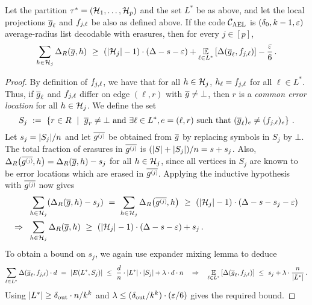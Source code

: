 \begin{lemma}\label{lemma:inductive}
Let the partition $\tau^* = ({\mathcal H}_1, \ldots, {\mathcal H}_p)$ and the set $L^*$ be as above, and let the local projections $\overline{g}_{\ell}$ and $f_{j,\ell}$ be also as defined above. If the code ${ {\mathcal C}_{\mathrm{AEL}} }$ is $(\delta_0,k-1,\varepsilon)$ average-radius list decodable with erasures, then for every $j\in [p]$,
\[			
\sum_{h\in \calH_j} \Delta_R(\erase{g},h) ~\geq~  (|\calH_j|-1) \cdot \inparen{\Delta - s - \eps} + \Ex{\ell \in L^*}{\Delta(\gl, \fjl)} - \frac{\eps}{6} \mper
\]
\end{lemma}
%
\begin{proof}
%
By definition of $f_{j,\ell}$, we have that for all $h \in {\mathcal H}_j$, $h_{\ell} = f_{j,\ell}$ for all $\ell \in L^*$. Thus, if $\overline{g}_{\ell}$ and $f_{j,\ell}$ differ on edge $(\ell,r)$ with $\overline{g} \neq \bot$, then $r$ is a \emph{common error location} for all $h \in {\mathcal H}_j$. We define the set 
\[
S_j ~:=~ \left\{r \in R ~\mid~ \overline{g}_r \neq \bot ~\text{and}~ \exists \ell \in L^*, e = (\ell,r) ~\text{such that}~ (\overline{g}_{\ell})_e \neq (f_{j,\ell})_e \right\} \,.
\]
Let $s_j = \lvert S_j\rvert/n$ and let $\gj$ be obtained from $\overline{g}$ by replacing symbols in $S_j$ by $\bot$. 
%
The total fraction of erasures in $\gj$ is $(\lvert S\rvert+\lvert S_j\rvert)/n = s+s_j$. Also, $\Delta_R\parens[\big]{\gj,h} = \Delta_R(\erase{g},h) - s_j$ for all $h \in {\mathcal H}_j$, since all vertices in $S_j$ are known to be error locations which are erased in $\gj$. Applying the inductive hypothesis with $\gj$ now gives
\begin{align*}
&\sum_{h \in \calH_j} (\Delta_R(\erase{g},h) - s_j)
~=~ \sum_{h \in \calH_j} \Delta_R\parens[\big]{\gj,h} 
~\geq~ (\abs{\calH_j}-1) \cdot (\Delta - s - s_j - \eps) \\
\implies~~
&\sum_{h \in \calH_j} \Delta_R(\erase{g},h) ~\geq~ (\abs{\calH_j}-1) \cdot (\Delta - s - \eps) + s_j \mper
\end{align*}
%
To obtain a bound on $s_j$, we again use expander mixing lemma to deduce
\[
\sum_{\ell \in L^*} \Delta(\gl,\fjl) \cdot d ~=~ \abs{E(L^*, S_j)} ~\leq~ \frac{d}{n} \cdot \abs{L^*} \cdot \abs{S_j} + \lambda \cdot d \cdot n 
\quad \implies \quad
\Ex{\ell \in L^*}{\Delta(\gl, \fjl)} ~\leq~ s_j + \lambda \cdot \frac {n}{\abs{L^*}} 
\mper 
\]
Using $\lvert L^*\rvert \geq \delta_{\mathrm{out}} \cdot n / k^k$ and $\lambda \leq (\delta_{\mathrm{out}}/k^k) \cdot (\varepsilon/6)$ gives the required bound.
%
\end{proof}


